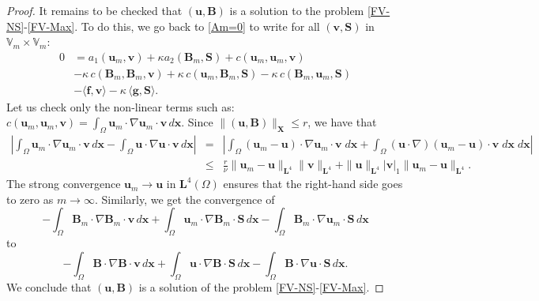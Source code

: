 \documentclass[3p]{elsarticle}
\def\V#1{\mathbf{#1}}
\def\VX{\mathbf{X}}
\begin{document}
\begin{proof}
It remains to be checked that $(\V{u},\V{B})$ is a solution to the problem \eqref{FV-NS}-\eqref{FV-Max}.  To do this, we go back to 
\eqref{Am=0} to write for all $(\V{v},\V{S})$ in 
$\mathbb{V}_m \times \mathbb{V}_m$:
\begin{equation*} %
\begin{aligned}
0 &=
a_1(\V{u}_m,\V{v})
+ \kappa a_2(\V{B}_m, \V{S})
+ c(\V{u}_m,\V{u}_m,\V{v})
\\ & 
- \kappa \, c(\V{B}_m,\V{B}_m,\V{v})
+\kappa \, c(\V{u}_m,\V{B}_m,\V{S})
- \kappa \,c(\V{B}_m,\V{u}_m,\V{S})
 \\ & 
 - \langle \V{f}, \V{v} \rangle 
- \kappa \, \langle \V{g}, \V{S} \rangle.
 \end{aligned}
\end{equation*}
Let us check only the non-linear terms such as: $\displaystyle c(\V{u}_m,\V{u}_m, \V{v})=\int_\Omega \V{u}_m \cdot \nabla \V{u}_m \cdot \V{v} \, d\V{x}$. Since $\|(\V{u},\V{B})\|_\VX \le r $, we have that
\begin{eqnarray*}
\left|
\int_\Omega \V{u}_m \cdot \nabla \V{u}_m \cdot \V{v} \, d\V{x} 
- \int_\Omega \V{u} \cdot \nabla \V{u} \cdot \V{v} \, d\V{x} 
\right|
&=& 
\left|
\int_\Omega(\V{u}_m-\V{u})\cdot\nabla\V{u}_m\cdot\V{v}\;d\V{x}
+\int_\Omega(\V{u}\cdot\nabla)(\V{u}_m-\V{u})\cdot\V{v}\;d\V{x}\;d\V{x}  
\right|
\\ &\le& \frac{r}{\nu} \|\V{u}_m-\V{u}\|_{\V{L}^4} \|\V{v}\|_{\V{L}^4}
+\|\V{u}\|_{\V{L}^4}|\V{v}|_1\|\V{u}_m-\V{u}\|_{\V{L}^4}.
\end{eqnarray*}
The strong convergence $\V{u}_m \longrightarrow \V{u}$
in $\V{L}^4(\Omega) $ ensures that the right-hand side goes to zero as $m \rightarrow\infty$.
Similarly, we get the convergence of 
\begin{equation*}
- \int_\Omega \V{B}_m \cdot \nabla \V{B}_m \cdot \V{v} \, d\V{x}   
+  \int_\Omega \V{u}_m \cdot \nabla \V{B}_m \cdot \V{S} \, d\V{x} 
- \int_\Omega \V{B}_m \cdot \nabla \V{u}_m \cdot \V{S} \, d\V{x}     
\end{equation*}
to 
\begin{equation*}
- \int_\Omega \V{B} \cdot \nabla \V{B} \cdot \V{v} \, d\V{x}  
+  \int_\Omega \V{u} \cdot \nabla \V{B} \cdot \V{S} \, d\V{x} 
- \int_\Omega \V{B} \cdot \nabla \V{u} \cdot \V{S} \, d\V{x}.
\end{equation*}
We conclude that $(\V{u},\V{B})$ is a solution of the problem \eqref{FV-NS}-\eqref{FV-Max}.


\end{proof}
\end{document}
